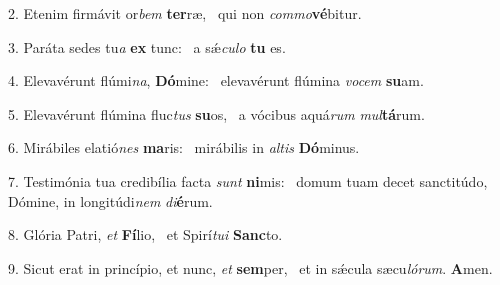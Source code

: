 2. Etenim firmávit or\textit{bem} \textbf{ter}ræ, \ast\  qui non \textit{com}\textit{mo}\textbf{vé}bitur.\

3. Paráta sedes tu\textit{a} \textbf{ex} tunc: \ast\  a sǽ\textit{cu}\textit{lo} \textbf{tu} es.\

4. Elevavérunt flúmi\textit{na}, \textbf{Dó}mine: \ast\  elevavérunt flúmina \textit{vo}\textit{cem} \textbf{su}am.\

5. Elevavérunt flúmina fluc\textit{tus} \textbf{su}os, \ast\  a vócibus aquá\textit{rum} \textit{mul}\textbf{tá}rum.\

6. Mirábiles elatió\textit{nes} \textbf{ma}ris: \ast\  mirábilis in \textit{al}\textit{tis} \textbf{Dó}minus.\

7. Testimónia tua credibília facta \textit{sunt} \textbf{ni}mis: \ast\  domum tuam decet sanctitúdo, Dómine, in longitúdi\textit{nem} \textit{di}\textbf{é}rum.\

8. Glória Patri, \textit{et} \textbf{Fí}lio, \ast\  et Spirí\textit{tu}\textit{i} \textbf{Sanc}to.\

9. Sicut erat in princípio, et nunc, \textit{et} \textbf{sem}per, \ast\  et in sǽcula sæcu\textit{ló}\textit{rum}. \textbf{A}men.\

